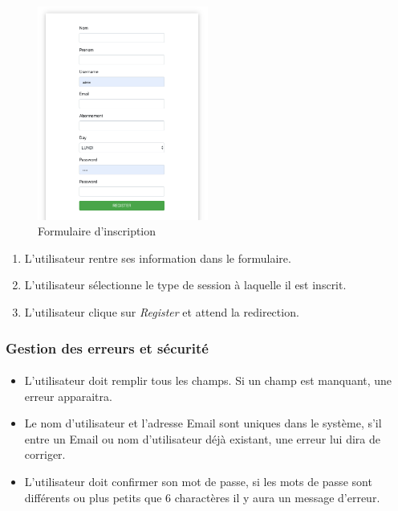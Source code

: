\begin{figure}[h]
	\includegraphics[width=0.5\textwidth,center]{Figures/us1-1}
	\caption{Formulaire d'inscription}
\end{figure}

\vspace{\baselineskip}
\begin{enumerate}
	\item L'utilisateur rentre ses information dans le formulaire. 
	\item L'utilisateur sélectionne le type de session à laquelle il est inscrit. 
	\item L'utilisateur clique sur \textit{Register} et attend la redirection. 
\end{enumerate}

\newpage
\subsubsection{Gestion des erreurs et sécurité}
	\paragraph{}
		\begin{itemize}
			\item L'utilisateur doit remplir tous les champs. Si un champ est manquant, une erreur apparaitra. 
			\item Le nom d'utilisateur et l'adresse Email sont uniques dans le système, s'il entre un Email ou nom d'utilisateur déjà existant, une erreur lui dira de corriger.
			\item L'utilisateur doit confirmer son mot de passe, si les mots de passe sont différents ou plus petits que 6 charactères il y aura un message d'erreur.
		\end{itemize}
		
